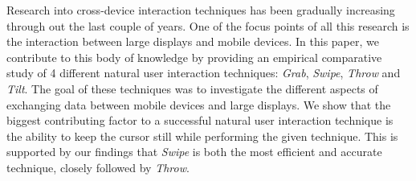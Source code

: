 
Research into cross-device interaction techniques has been gradually increasing through out the last couple of years. 
One of the focus points of all this research is the interaction between large displays and mobile devices.
In this paper, we contribute to this body of knowledge by providing an empirical comparative study of 4 different natural user interaction techniques: \textit{Grab}, \textit{Swipe}, \textit{Throw} and \textit{Tilt}.
The goal of these techniques was to investigate the different aspects of exchanging data between mobile devices and large displays. 
We show that the biggest contributing factor to a successful natural user interaction technique is the ability to keep the cursor still while performing the given technique.
This is supported by our findings that \textit{Swipe} is both the most efficient and accurate technique, closely followed by \textit{Throw}.

